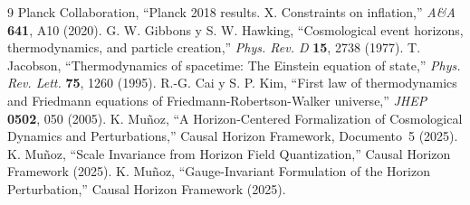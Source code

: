 \documentclass[12pt,a4paper]{article}
\begin{document}
\begin{thebibliography}{9}
 Planck Collaboration, ``Planck 2018 results. X. Constraints on inflation,'' \textit{A\&A} \textbf{641}, A10 (2020).
 G. W. Gibbons y S. W. Hawking, ``Cosmological event horizons, thermodynamics, and particle creation,'' \textit{Phys. Rev. D} \textbf{15}, 2738 (1977).
 T. Jacobson, ``Thermodynamics of spacetime: The Einstein equation of state,'' \textit{Phys. Rev. Lett.} \textbf{75}, 1260 (1995).
 R.-G. Cai y S. P. Kim, ``First law of thermodynamics and Friedmann equations of Friedmann-Robertson-Walker universe,'' \textit{JHEP} \textbf{0502}, 050 (2005).
 K. Mu\~noz, ``A Horizon-Centered Formalization of Cosmological Dynamics and Perturbations,'' Causal Horizon Framework, Documento~5 (2025).
 K. Mu\~noz, ``Scale Invariance from Horizon Field Quantization,'' Causal Horizon Framework (2025).
 K. Mu\~noz, ``Gauge-Invariant Formulation of the Horizon Perturbation,'' Causal Horizon Framework (2025).
\end{thebibliography}
\end{document}
